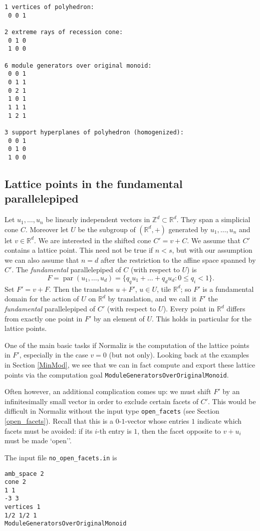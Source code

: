 \documentclass[12pt,a4paper]{scrartcl}
\theoremstyle{definition}
\def\ZZ{{\mathbb Z}}
\def\RR{{\mathbb R}}
\DeclareMathOperator{\para}{par}
\begin{document}
{\begin{Verbatim}
1 vertices of polyhedron:
 0 0 1

2 extreme rays of recession cone:
 0 1 0
 1 0 0

6 module generators over original monoid:
 0 0 1
 0 1 1
 0 2 1
 1 0 1
 1 1 1
 1 2 1

3 support hyperplanes of polyhedron (homogenized):
 0 0 1
 0 1 0
 1 0 0
\end{Verbatim}

\subsection{Lattice points in the fundamental parallelepiped}\label{LattPointsFPE}

Let $u_1,\dots,u_n$ be linearly independent vectors in $\ZZ^d\subset\RR^d$. They span a simplicial cone $C$. Moreover let $U$ be the subgroup of $(\RR^d,+)$ generated by $u_1,\dots,u_n$ and let $v\in\RR^d$. We are interested in the shifted cone $C'=v+C$. We assume that $C'$ contains a lattice point. This need not be true if $n<s$, but with our assumption we can also assume that $n=d$ after the restriction to the affine space spanned by $C'$. The \emph{fundamental} parallelepiped of $C$ (with respect to $U$) is
$$
F=\para(u_1,\dots,u_d)=\{q_qu_1+\dots+q_du_d: 0\le q_i<1  \}.
$$
Set $F'=v+F$. Then the translates $u+F'$, $u\in U$, tile $\RR^d$; so $F'$ is a fundamental domain for the action of $U$ on $\RR^d$ by translation, and we call it $F'$ the \emph{fundamental} parallelepiped of $C'$  (with respect to $U$). Every point in $\RR^d$ differs from exactly one point in $F'$ by an element of $U$. This holds in particular for the lattice points.

One of the main basic tasks if Normaliz is the computation of the lattice points in $F'$, especially in the case $v=0$ (but not only). Looking back at the examples in Section \ref{MinMod}, we see that we can in fact compute and export these lattice points via the computation goal \verb|ModuleGeneratorsOverOriginalMonoid|. 

Often however, an additional complication comes up: we  must shift $F'$ by an infinitesimally small vector in order to exclude certain facets of $C'$. This would be difficult in Normaliz without the input type \verb|open_facets| (see Section \ref{open_facets}). Recall that this is a $0$-$1$-vector whose entries $1$ indicate which facets must be avoided: if its $i$-th entry is $1$, then the facet opposite to $v+u_i$ must be made `open''.

The input file \verb|no_open_facets.in| is
\begin{Verbatim}
amb_space 2
cone 2
1 1
-3 3
vertices 1
1/2 1/2 1
ModuleGeneratorsOverOriginalMonoid
\end{Verbatim}

}
\end{document}
